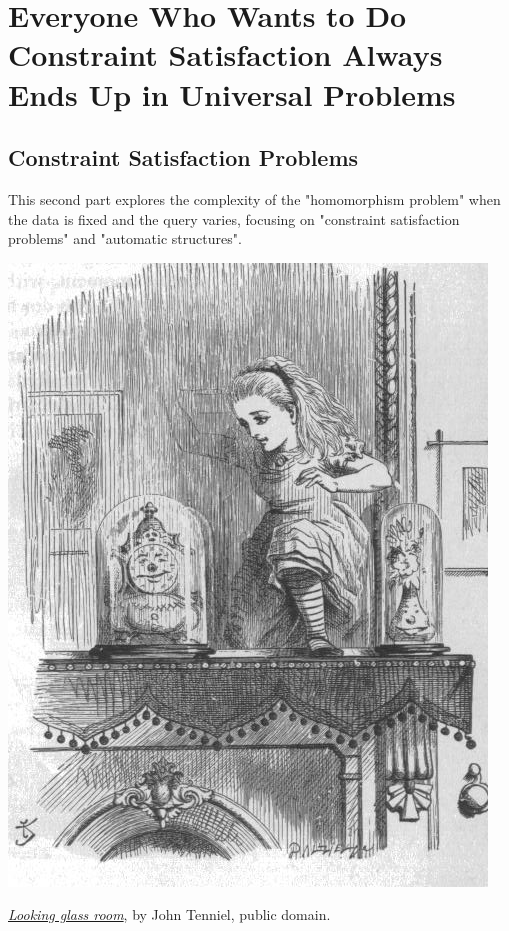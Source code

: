 \section{Everyone Who Wants to Do Constraint Satisfaction Always Ends Up in Universal Problems}
\label{sec:intro-universal}

\subsection{Constraint Satisfaction Problems}

This second part explores the complexity of the "homomorphism problem" when the data is fixed and the query varies, focusing on "constraint satisfaction problems" and "automatic structures".

\begin{marginfigure}[-15em]
	\centering
	\includegraphics[width=\linewidth]{fig/intro/aliceroom2.jpg}
	\caption{\href{https://commons.wikimedia.org/wiki/File:Aliceroom2.jpg}{\emph{Looking glass room}}, by John Tenniel, public domain.}
\end{marginfigure}

